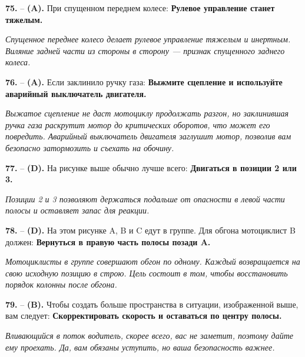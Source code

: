 \begin{minipage}{\linewidth}
\noindent\textbf{75.}  -- \textbf {(A).} При спущенном переднем колесе:  \textbf {Рулевое управление станет тяжелым.} \par \textit {Спущенное переднее колесо делает рулевое управление тяжелым и инертным. Виляние задней части из стороны в сторону — признак спущенного заднего колеса.} \\
\end{minipage}

\begin{minipage}{\linewidth}
\noindent\textbf{76.}  -- \textbf {(A).} Если заклинило ручку газа:  \textbf {Выжмите сцепление и используйте аварийный выключатель двигателя.} \par \textit {Выжатое сцепление не даст мотоциклу продолжать разгон, но заклинившая ручка газа раскрутит мотор до критических оборотов, что может его повредить. Аварийный выключатель двигателя заглушит мотор, позволив вам безопасно затормозить и съехать на обочину.} \\
\end{minipage}

\begin{minipage}{\linewidth}
\noindent\textbf{77.}  -- \textbf {(D).} На рисунке выше обычно лучше всего:  \textbf {Двигаться в позиции 2 или 3.} \par \textit {Позиции 2 и 3 позволяют держаться подальше от опасности в левой части полосы и оставляет запас для реакции.} \\
\end{minipage}

\begin{minipage}{\linewidth}
\noindent\textbf{78.}  -- \textbf {(D).} На этом рисунке A, B и C едут в группе. Для обгона мотоциклист B должен:  \textbf {Вернуться в правую часть полосы позади A.} \par \textit {Мотоциклисты в группе совершают обгон по одному. Каждый возвращается на свою исходную позицию в строю. Цель состоит в том, чтобы восстановить порядок колонны после обгона.} \\
\end{minipage}

\begin{minipage}{\linewidth}
\noindent\textbf{79.}  -- \textbf {(B).} Чтобы создать больше пространства в ситуации, изображенной выше, вам следует:  \textbf {Скорректировать скорость и оставаться по центру полосы.} \par \textit {Вливающийся в поток водитель, скорее всего, вас не заметит, поэтому дайте ему проехать. Да, вам обязаны уступить, но ваша безопасность важнее.} \\
\end{minipage}

